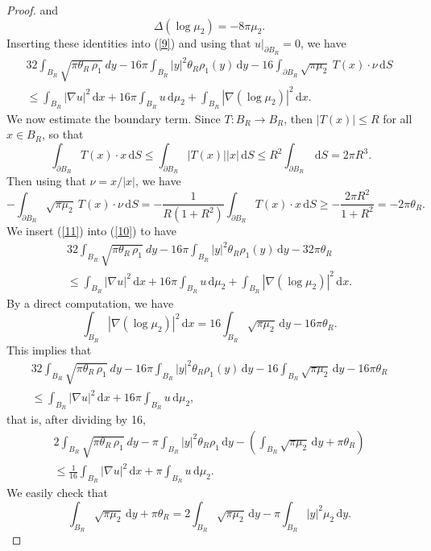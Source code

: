 \documentclass[10pt]{article}
\numberwithin{equation}{section}
\theoremstyle{plain}
\theoremstyle{definition}
\theoremstyle{remark}
\newcommand{\ib}{\int_{B_R}}
\newcommand\dd{\,\mbox{d} }
\begin{document}
\begin{proof}
and
\[\Delta (\log \mu_2) = -8\pi\mu_2.\]
Inserting these identities into (\ref{9}) and using that $u\vert_{\partial B_R} =0$,  we have
\begin{eqnarray}\label{10}
32\int_{B_R} \sqrt{\pi\theta_R\, \rho_1} \ dy  - 16\pi\int_{B_R}|y|^2\theta_R\rho_1(y) \dd y -  16\int_{\partial B_R} \sqrt{\pi \mu_2} \ T(x) \cdot \nu \dd S\nonumber \\
 \leq  \ib |\nabla u|^2 \dd x  +16\pi \ib  u \dd\mu_2 +     \ib |\nabla (\log \mu_2)|^2 \dd x.  \qquad \qquad
\end{eqnarray}
We now estimate the boundary term. Since $T: B_R \rightarrow B_R$, then $|T(x)|\leq R$ for all $x\in B_R$, so that
 \[ \ \int_{\partial B_R} T(x)\cdot x \dd S \leq \int_{\partial B_R} |T(x)||x| \dd S \leq R^2 \int_{\partial B_R} \dd S =2 \pi R^3.\]
 Then using that $\nu=x/|x|$, we have
 \begin{equation}\label{11}
 -\int_{\partial B_R} \sqrt{\pi \mu_2} \ T(x) \cdot \nu \dd S =  -\frac{1}{R(1+R^2)}\int_{\partial B_R} T(x)\cdot x\dd S \geq -\frac{2\pi R^2}{1+R^2} = -2\pi\theta_R.
 \end{equation}
We insert (\ref{11}) into (\ref{10}) to have
\begin{eqnarray}\label{12}
32\int_{B_R} \sqrt{\pi\theta_R\, \rho_1} \ dy  - 16\pi\int_{B_R}|y|^2\theta_R\rho_1(y) \dd y -  32\pi\theta_R \nonumber \\
 \leq  \ib |\nabla u|^2 \dd x  +16\pi \ib  u \dd\mu_2 +     \ib |\nabla (\log \mu_2)|^2 \dd x.
\end{eqnarray}
By a direct computation, we have
\[\ib |\nabla(\log\mu_2)|^2 \dd x = 16 \ib \sqrt{\pi\mu_2} \dd y  - 16\pi\theta_R.\]
This implies that
\begin{eqnarray*}
32\int_{B_R} \sqrt{\pi\theta_R\, \rho_1} \ dy  - 16\pi\int_{B_R}|y|^2\theta_R\rho_1(y) \dd y - 16\ib \sqrt{\pi\mu_2}\dd y -16\pi\theta_R \nonumber \\
 \leq  \ib |\nabla u|^2 \dd x  +16\pi \ib  u \dd\mu_2, \qquad \qquad \qquad \qquad
\end{eqnarray*}
that is, after dividing by 16,
\begin{eqnarray}\label{13}
2\int_{B_R} \sqrt{\pi\theta_R\, \rho_1} \ dy  - \pi\int_{B_R}|y|^2\theta_R\rho_1 \dd y - \left(\ib \sqrt{\pi\mu_2}\dd y +\pi\theta_R\right) \nonumber \\
 \leq  \frac{1}{16}\ib |\nabla u|^2 \dd x  +\pi \ib  u \dd\mu_2. \qquad \qquad \qquad \qquad
\end{eqnarray}
We easily check that 
\[\ib \sqrt{\pi\mu_2}\dd y + \pi\theta_R = 2\ib \sqrt{\pi\mu_2}\dd y - \pi \ib |y|^2\mu_2 \dd y.\]

\end{proof}
\end{document}
